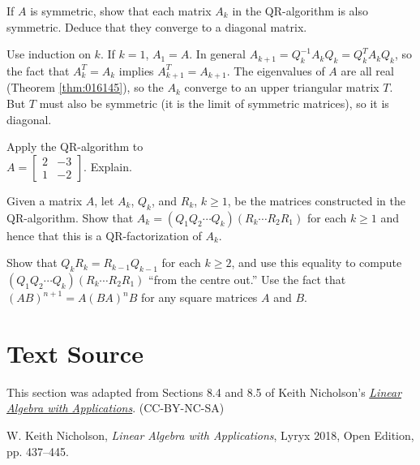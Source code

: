 \documentclass{ximera}
\begin{document}
\begin{problem}\label{prob:QR-symmetric}
If $A$ is symmetric, show that each matrix $A_{k}$ in the QR-algorithm is also symmetric. Deduce that they converge to a diagonal matrix.

\begin{hint}
Use induction on $k$. If $k = 1$, $A_{1} = A$. In general $A_{k+1} = Q_{k}^{-1}A_{k}Q_{k} = Q_{k}^{T}A_{k}Q_{k}$, so the fact that $A_{k}^{T} = A_{k}$ implies $A_{k+1}^{T} = A_{k+1}$. The eigenvalues of $A$ are all real (Theorem \ref{thm:016145}), so the $A_{k}$ converge to an upper triangular matrix $T$. But $T$ must also be symmetric (it is the limit of symmetric matrices), so it is diagonal.
\end{hint}
\end{problem}

\begin{problem}\label{QR-special-2x2}
Apply the QR-algorithm to \\ $A = \left[ \begin{array}{rr}
2 & -3 \\
1 & -2
\end{array}\right]$. Explain.
\end{problem}

\begin{problem}\label{prob:analyzeQRalgorithm}
Given a matrix $A$, let $A_{k}$, $Q_{k}$, and $R_{k}$, $k \geq 1$, be the matrices constructed in the QR-algorithm. Show that $A_{k} = (Q_{1}Q_{2} \cdots Q_{k})(R_{k} \cdots R_{2}R_{1})$ for each $k \geq 1$ and hence that this is a QR-factorization of $A_{k}$. 
\begin{hint}
Show that $Q_{k}R_{k} = R_{k-1}Q_{k-1}$ for each $k \geq 2$, and use this equality to compute $(Q_{1}Q_{2} \cdots Q_{k})(R_{k} \cdots R_{2}R_{1})$ ``from the centre out.'' Use the fact that $(AB)^{n+1} = A(BA)^{n}B$ for any square matrices $A$ and $B$.
\end{hint}
\end{problem}

\section*{Text Source} This section was adapted from Sections 8.4 and 8.5 of Keith Nicholson's \href{https://open.umn.edu/opentextbooks/textbooks/linear-algebra-with-applications}{\it Linear Algebra with Applications}. (CC-BY-NC-SA)

W. Keith Nicholson, {\it Linear Algebra with Applications}, Lyryx 2018, Open Edition, pp. 437--445.
\end{document}
